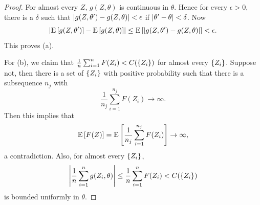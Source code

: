 \begin{proof}
    For almost every $Z$, $g(Z,\theta)$ is continuous in $\theta$. 
    Hence for every $\epsilon>0$, there is a $\delta$ such that 
    $\left\lvert {g(Z,\theta') - g(Z,\theta)} \right\rvert<\epsilon$ if $\left\lvert {\theta' - \theta} \right\rvert<\delta$. 
    Now 
    \begin{equation*}
        \left\lvert {\operatorname{E}\left[ {g(Z,\theta')} \right] - \operatorname{E}\left[ {g(Z,\theta)} \right]} \right\rvert 
        \leq \operatorname{E}\left[ {\left\lvert {g(Z,\theta') - g(Z,\theta)} \right\rvert} \right] < \epsilon. 
    \end{equation*}
    This proves (a). 

    For (b), we claim that $\frac{1}{n}\sum_{i=1}^nF(Z_i)<C(\left\{ {Z_i} \right\})$ for 
    almost every $\left\{ {Z_i} \right\}$. Suppose not, then there is a set 
    of $\left\{ {Z_i} \right\}$ with positive probability such that there 
    is a subsequence $n_j$ with 
    \begin{equation*}
        \frac{1}{n_j}\sum_{i=1}^{n_j}F(Z_i)\to\infty.
    \end{equation*}
    Then this implies that 
    \begin{equation*}
        \operatorname{E}\left[ {F(Z)} \right] = \operatorname{E}\left[ {\frac{1}{n_j}\sum_{i=1}^{n_j}F(Z_i)} \right]\to\infty, 
    \end{equation*}
    a contradiction. Also, for almost every $\left\{ {Z_i} \right\}$, 
    \begin{equation*}
        \left\lvert {\frac{1}{n}\sum_{i=1}^ng(Z_i,\theta)} \right\rvert\leq \frac{1}{n}\sum_{i=1}^nF(Z_i) < C(\left\{ {Z_i} \right\})
    \end{equation*}
    is bounded uniformly in $\theta$. 
    

\end{proof}
